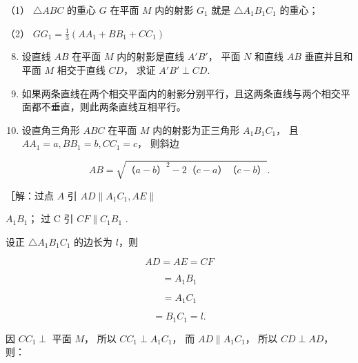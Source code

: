 （1） \(\triangle ABC\) 的重心 \(G\) 在平面 \(M\) 内的射影 \(G_{1}\)
就是 \(\triangle A_{1}B_{1}C_{1}\) 的重心；

（2） \(GG_{1} = \frac{1}{3} (AA_{1} + BB_{1} + CC_{1})\)

\begin{enumerate}
\setcounter{enumi}{7}
\item
  设直线 \(AB\) 在平面 \(M\) 内的射影是直线 \(A'B'\)， 平面 \(N\) 和直线
  \(AB\) 垂直并且和平面 \(M\) 相交于直线 \(CD\)， 求证
  \(A'B' \perp CD\).
\item
  如果两条直线在两个相交平面内的射影分别平行，且这两条直线与两个相交平面都不垂直，则此两条直线互相平行。
\item
  设直角三角形 \(ABC\) 在平面 \(M\) 内的射影为正三角形
  \(A_{1}B_{1}C_{1}\)， 且 \(AA_{1} = a, BB_{1} = b, CC_{1} = c\)，
  则斜边
\end{enumerate}

\[
A B = \sqrt {\text{（}a - b\text{）} ^ {2} - 2 \text{（}c - a\text{）} \text{（}c - b\text{）}}.
\]

［解：过点 \(A\) 引 \(AD \parallel A_1C_1, AE \parallel\)

\(A_{1}B_{1}\)； 过 C 引 \(CF \parallel C_{1}B_{1}\) .

设正 \(\triangle A_{1}B_{1}C_{1}\) 的边长为 \(l\)，则

\[
A D = A E = C F
\]

\[
= A _ {1} B _ {1}
\]

\[
= A _ {1} C _ {1}
\]

\[
= B _ {1} C _ {1} = l.
\]

因 \(CC_{1} \perp\) 平面 \(M\)， 所以 \(CC_{1} \perp A_{1}C_{1}\)， 而
\(AD \parallel A_{1}C_{1}\)， 所以 \(CD \perp AD\)， 则：

